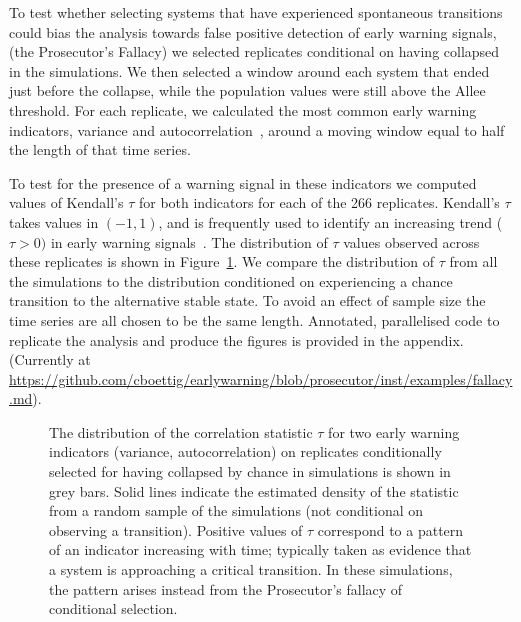 \documentclass[authoryear,review,12pt]{elsarticle}
\newif\ifhavefigures
\begin{document}
To test whether selecting systems that have experienced
spontaneous transitions could bias the analysis towards false
positive detection of early warning signals, (the Prosecutor's
Fallacy) we selected replicates conditional on having collapsed
in the simulations.  We then selected a window around each system
that ended just before the collapse, while the population values
were still above the Allee threshold.  For each replicate, we
calculated the most common early warning indicators, variance and
autocorrelation~\citep[\emph{e.g.}][]{Carpenter2006,Dakos2008,Scheffer2009},
around a moving window equal to half the length of that time series.


To test for the presence of a warning signal in these indicators we
computed values of Kendall's $\tau$ for both indicators for each of
the 266 replicates.  Kendall's $\tau$ takes values in $(-1, 1)$, and is
frequently used to identify an increasing trend ($\tau > 0 )$ in early
warning signals~\citep{Dakos2008, Dakos2011}.  The distribution
of $\tau$ values observed across these replicates is shown in
Figure~\ref{fig:indicator}.   
We compare the distribution of $\tau$ from all the simulations to
the distribution conditioned on experiencing a chance transition to the
alternative stable state.  To avoid an effect of sample size the time series are all chosen
to be the same length.  
Annotated, parallelised code to replicate the analysis
and produce the figures is provided in the appendix.  (Currently at
\href{https://github.com/cboettig/earlywarning/blob/prosecutor/inst/examples/fallacy.md}{https://github.com/cboettig/earlywarning/blob/prosecutor/inst/examples/fallacy.md}).


\begin{figure}
  \begin{center}
    \ifhavefigures
    \fi
  \end{center}
  \caption{The distribution of the correlation statistic $\tau$ for two
  early warning indicators (variance, autocorrelation) on replicates
  conditionally selected for having collapsed by chance in simulations
  is shown in grey bars.  Solid lines indicate the estimated density of
  the statistic from a random sample of the simulations (not conditional
  on observing a transition). Positive values of $\tau$ correspond to
  a pattern of an indicator increasing with time; typically taken as
  evidence that a system is approaching a critical transition.  In these
  simulations, the pattern arises instead from the Prosecutor's fallacy
  of conditional selection.}
  \label{fig:indicator}
\end{figure}
\end{document}
